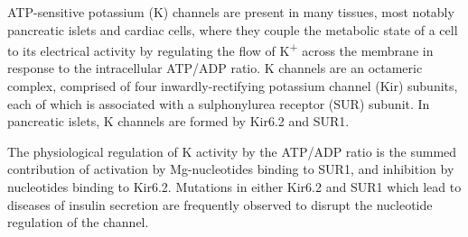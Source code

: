 ATP-sensitive potassium (K\ATP{}) channels are present in many tissues, most notably pancreatic islets and cardiac cells, where they couple the metabolic state of a cell to its electrical activity by regulating the flow of K\textsuperscript{+} across the membrane in response to the intracellular ATP/ADP ratio.
K\ATP{} channels are an octameric complex, comprised of four inwardly-rectifying potassium channel (Kir) subunits, each of which is associated with a sulphonylurea receptor (SUR) subunit. 
In pancreatic islets, K\ATP{} channels are formed by Kir6.2 and SUR1.

The physiological regulation of K\ATP{} activity by the ATP/ADP ratio is the summed contribution of activation by Mg-nucleotides binding to SUR1, and inhibition by nucleotides binding to Kir6.2.
Mutations in either Kir6.2 and SUR1 which lead to diseases of insulin secretion are frequently observed to disrupt the nucleotide regulation of the channel.
